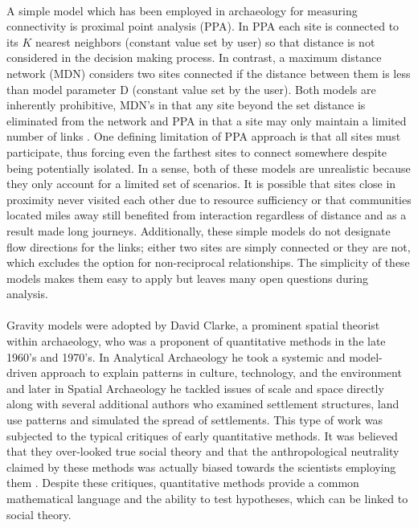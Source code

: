\documentclass[12pt,a4paper]{thesis}
\begin{document}
\paragraph{}
A simple model which has been employed in archaeology \citep{Bro00} for measuring connectivity is proximal point analysis (PPA). In PPA each site is connected to its $K$ nearest neighbors (constant value set by user) so that distance is not considered in the decision making process. In contrast, a maximum distance network (MDN) considers two sites connected if the distance between them is less than model parameter D (constant value set by the user). Both models are inherently prohibitive, MDN's in that any site beyond the set distance is eliminated from the network and PPA in that a site may only maintain a limited number of links \cite[5-10]{ERK12}. One defining limitation of PPA approach is that all sites must participate, thus forcing even the farthest sites to connect somewhere despite being potentially isolated. In a sense, both of these models are unrealistic because they only account for a limited set of scenarios. It is possible that sites close in proximity never visited each other due to resource sufficiency or  that communities located miles away still benefited from interaction regardless of distance and as a result made long journeys. Additionally, these simple models do not designate flow directions for the links; either two sites are simply connected or they are not, which excludes the option for non-reciprocal relationships. The simplicity of these models makes them easy to apply but leaves many open questions during analysis.

\paragraph{}	
Gravity models were  adopted by David Clarke, a prominent spatial theorist within archaeology, who was a proponent of quantitative methods in the late 1960's and 1970's. In Analytical Archaeology he took a systemic and model-driven approach to explain patterns in culture, technology, and the environment \citep{Cla68} and later in Spatial Archaeology \citep{Cla77}  he tackled issues of scale and space directly along with several additional authors who examined settlement structures, land use patterns and simulated the spread of settlements. This type of work was subjected  to the typical critiques of early quantitative methods. It was believed that they over-looked true social theory and that the anthropological neutrality claimed by these methods was actually biased towards the scientists employing them \citep{Hod03}. Despite these critiques, quantitative methods provide a common mathematical language and the ability to test hypotheses, which can be linked to social theory.
\end{document}
